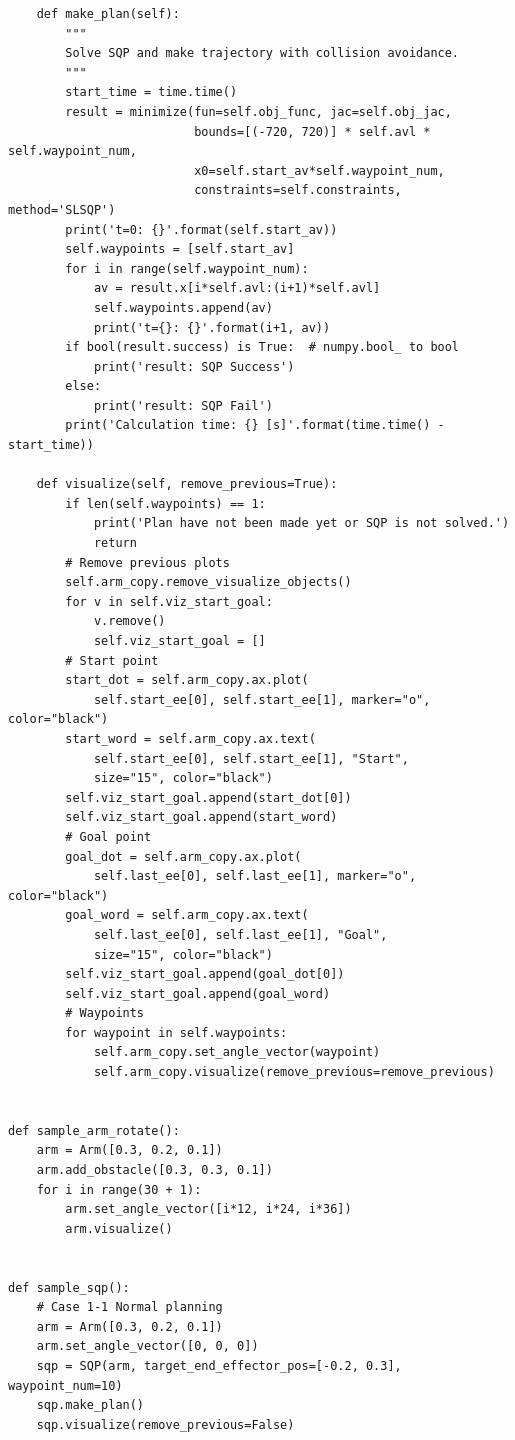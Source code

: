 \begin{verbatim}
    def make_plan(self):
        """
        Solve SQP and make trajectory with collision avoidance.
        """
        start_time = time.time()
        result = minimize(fun=self.obj_func, jac=self.obj_jac,
                          bounds=[(-720, 720)] * self.avl * self.waypoint_num,
                          x0=self.start_av*self.waypoint_num,
                          constraints=self.constraints, method='SLSQP')
        print('t=0: {}'.format(self.start_av))
        self.waypoints = [self.start_av]
        for i in range(self.waypoint_num):
            av = result.x[i*self.avl:(i+1)*self.avl]
            self.waypoints.append(av)
            print('t={}: {}'.format(i+1, av))
        if bool(result.success) is True:  # numpy.bool_ to bool
            print('result: SQP Success')
        else:
            print('result: SQP Fail')
        print('Calculation time: {} [s]'.format(time.time() - start_time))

    def visualize(self, remove_previous=True):
        if len(self.waypoints) == 1:
            print('Plan have not been made yet or SQP is not solved.')
            return
        # Remove previous plots
        self.arm_copy.remove_visualize_objects()
        for v in self.viz_start_goal:
            v.remove()
            self.viz_start_goal = []
        # Start point
        start_dot = self.arm_copy.ax.plot(
            self.start_ee[0], self.start_ee[1], marker="o", color="black")
        start_word = self.arm_copy.ax.text(
            self.start_ee[0], self.start_ee[1], "Start",
            size="15", color="black")
        self.viz_start_goal.append(start_dot[0])
        self.viz_start_goal.append(start_word)
        # Goal point
        goal_dot = self.arm_copy.ax.plot(
            self.last_ee[0], self.last_ee[1], marker="o", color="black")
        goal_word = self.arm_copy.ax.text(
            self.last_ee[0], self.last_ee[1], "Goal",
            size="15", color="black")
        self.viz_start_goal.append(goal_dot[0])
        self.viz_start_goal.append(goal_word)
        # Waypoints
        for waypoint in self.waypoints:
            self.arm_copy.set_angle_vector(waypoint)
            self.arm_copy.visualize(remove_previous=remove_previous)


def sample_arm_rotate():
    arm = Arm([0.3, 0.2, 0.1])
    arm.add_obstacle([0.3, 0.3, 0.1])
    for i in range(30 + 1):
        arm.set_angle_vector([i*12, i*24, i*36])
        arm.visualize()


def sample_sqp():
    # Case 1-1 Normal planning
    arm = Arm([0.3, 0.2, 0.1])
    arm.set_angle_vector([0, 0, 0])
    sqp = SQP(arm, target_end_effector_pos=[-0.2, 0.3], waypoint_num=10)
    sqp.make_plan()
    sqp.visualize(remove_previous=False)


\end{verbatim}
